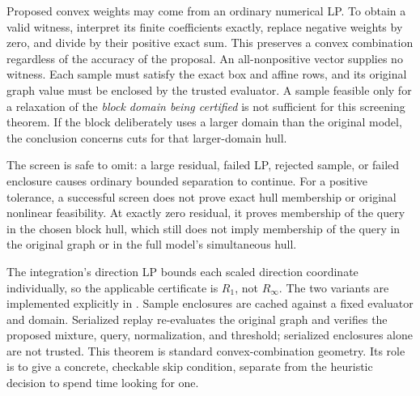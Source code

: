 Proposed convex weights may come from an ordinary numerical LP. To
obtain a valid witness, interpret its finite coefficients exactly,
replace negative weights by zero, and divide by their positive exact
sum. This preserves a convex combination regardless of the accuracy of
the proposal. An all-nonpositive vector supplies no witness. Each sample
must satisfy the exact box and affine rows, and its original graph value
must be enclosed by the trusted evaluator. A sample feasible only for a
relaxation of the \emph{block domain being certified} is not sufficient
for this screening theorem. If the block deliberately uses a larger
domain than the original model, the conclusion concerns cuts for that
larger-domain hull.

The screen is safe to omit: a large residual, failed LP, rejected sample,
or failed enclosure causes ordinary bounded separation to continue.
For a positive tolerance, a successful screen does not prove exact hull
membership or original nonlinear feasibility. At exactly zero residual,
it proves membership of the query in the chosen block hull, which still
does not imply membership of the query in the original graph or in the
full model's simultaneous hull.

The integration's direction LP bounds each scaled direction coordinate
individually, so the applicable certificate is $R_1$, not $R_\infty$.
The two variants are implemented explicitly in
. Sample enclosures
are cached against a fixed evaluator and domain. Serialized replay
re-evaluates the original graph and verifies the proposed mixture, query,
normalization, and threshold; serialized enclosures alone are not trusted.
This theorem is standard convex-combination geometry. Its role is to
give a concrete, checkable skip condition, separate from the heuristic
decision to spend time looking for one.
